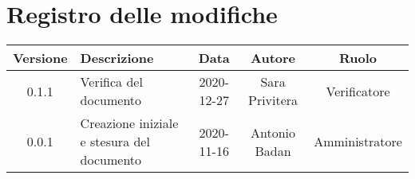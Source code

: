 \section*{Registro delle modifiche}

\begin{center}
	\begin{longtable}{|c|p{5cm}|c|c|c|}
	\hline
	\rowcolor{lighter-grayer}
	\textbf{Versione} & \textbf{Descrizione} & \textbf{Data} & \textbf{Autore} & \textbf{Ruolo} \\
	\hline
	\endfirsthead


	\hline
	0.1.1 & Verifica del documento & 2020-12-27 & Sara Privitera & Verificatore \\
	\hline
	0.0.1 & Creazione iniziale e stesura del documento & 2020-11-16 & Antonio Badan & Amministratore \\
	\hline
	\end{longtable}
\end{center}
